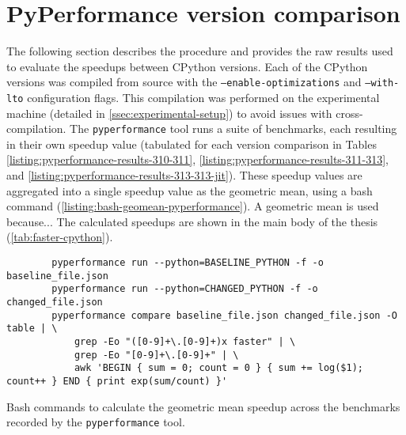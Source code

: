 \chapter{PyPerformance version comparison}
\label{chap:pyperformance-version-comparison}

The following section describes the procedure and provides the raw results used to evaluate the speedups between CPython versions.
Each of the CPython versions was compiled from source with the \texttt{--enable-optimizations} and \texttt{--with-lto} configuration flags. This compilation was performed on the experimental machine (detailed in \autoref{ssec:experimental-setup}) to avoid issues with cross-compilation.
The \texttt{pyperformance} tool runs a suite of benchmarks, each resulting in their own speedup value (tabulated for each version comparison in Tables \ref{listing:pyperformance-results-310-311}, \ref{listing:pyperformance-results-311-313}, and \ref{listing:pyperformance-results-313-313-jit}). These speedup values are aggregated into a single speedup value as the geometric mean, using a bash command (\autoref{listing:bash-geomean-pyperformance}).
A geometric mean is used because... %
The calculated speedups are shown in the main body of the thesis (\autoref{tab:faster-cpython}).

\vspace{2em}

\begin{code}
    \begin{verbatim}
        pyperformance run --python=BASELINE_PYTHON -f -o baseline_file.json
        pyperformance run --python=CHANGED_PYTHON -f -o changed_file.json
        pyperformance compare baseline_file.json changed_file.json -O table | \
            grep -Eo "([0-9]+\.[0-9]+)x faster" | \
            grep -Eo "[0-9]+\.[0-9]+" | \
            awk 'BEGIN { sum = 0; count = 0 } { sum += log($1); count++ } END { print exp(sum/count) }'
    \end{verbatim}
    \caption{Bash commands to calculate the geometric mean speedup across the benchmarks recorded by the \texttt{pyperformance} tool.}
    \label{listing:bash-geomean-pyperformance}
\end{code}

\vspace{2em}

